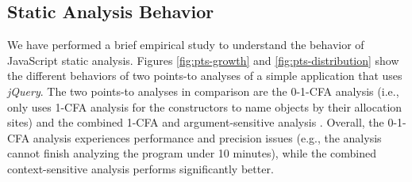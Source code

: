 

\subsection{Static Analysis Behavior}

We have performed a brief empirical study to understand the behavior of JavaScript static analysis. Figures \ref{fig:pts-growth} and \ref{fig:pts-distribution} show the different behaviors of two points-to analyses of a simple application that uses {\it jQuery}. The two points-to analyses in comparison are the 0-1-CFA analysis (i.e., only uses 1-CFA analysis for the constructors to name objects by their allocation sites) and the combined 1-CFA and argument-sensitive analysis \cite{Sridharan:2012:CTP:2367163.2367191}. Overall, the 0-1-CFA analysis experiences performance and precision issues (e.g., the analysis cannot finish analyzing the program under 10 minutes), while the combined context-sensitive analysis performs significantly better.

